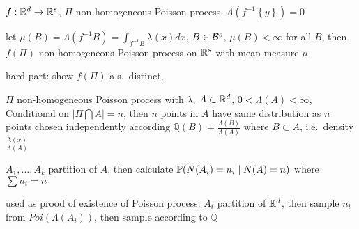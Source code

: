 \begin{setting}
     $f: \mathbb{R}^d \rightarrow \mathbb{R}^s$, $\Pi$ non-homogeneous Poisson process, $\Lambda(f^{-1}\left\{ y \right\}) = 0$
\end{setting}

\begin{thm}
    let $\mu(B) = \Lambda(f^{-1}B) = \int_{f^{-1}B} \lambda(x)dx$, $B \in \mathcal{B}^s$, $\mu(B) < \infty$ for all $B$, then
    $f(\Pi)$ non-homogeneous Poisson process on $\mathbb{R}^s$ with mean measure $\mu$
\end{thm}
\begin{pf}
    hard part: show $f(\Pi)$ a.s.\ distinct,
\end{pf}

\begin{thm}
    $\Pi$ non-homogeneous Poisson process with $\lambda$, $A \subset \mathbb{R}^d$, $0 < \Lambda(A) < \infty$, \\
    Conditional on $|\Pi \bigcap A| = n$, then $n$ points in $A$ have same distribution as $n$ points chosen independently
    according $\mathbb{Q}(B) = \frac{\Lambda(B)}{\Lambda(A)}$ where $B \subset A$, i.e.\ density $\frac{\lambda(x)}{\Lambda(A)}$
\end{thm}
\begin{pf}
    $A_1, \dots, A_k$ partition of $A$, then calculate $\mathbb{P}(N(A_i) = n_i \mid N(A) = n)$ where $\sum n_i = n$
\end{pf}

\begin{fact}
    used as prood of existence of Poisson process: $A_i$ partition of $\mathbb{R}^d$, then sample $n_i$ from $Poi(\Lambda(A_i))$, then sample according to $\mathbb{Q}$
\end{fact}

